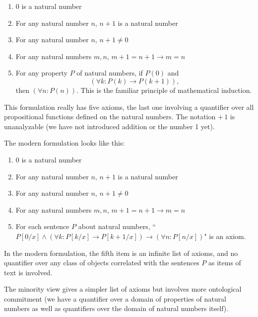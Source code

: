 \documentclass[12pt]{article}
\begin{document}
\begin{enumerate}

\item 0 is a natural number

\item  For any natural number $n$, $n+1$ is a natural number

\item  For any natural number $n$, $n+1 \neq 0$

\item  For any natural numbers $m,n$, $m+1 = n+1 \rightarrow m=n$

\item  For any property $P$ of natural numbers, if $P(0)$ and $$(\forall k:P(k) \rightarrow P(k+1)),$$ then $(\forall n:P(n))$.  This is the familiar principle of mathematical induction.

\end{enumerate}

This formulation really has five axioms, the last one involving a quantifier over all propositional functions defined on the natural numbers.  The notation $+\,1$ is unanalyzable (we have not introduced addition or the number 1 yet).

The modern formulation looks like this:

\begin{enumerate}

\item 0 is a natural number

\item  For any natural number $n$, $n+1$ is a natural number

\item  For any natural number $n$, $n+1 \neq 0$

\item  For any natural numbers $m,n$, $m+1 = n+1 \rightarrow m=n$

\item  For each sentence $P$ about natural numbers, ``$P[0/x] \wedge (\forall k:P[k/x] \rightarrow P[k+1/x]) \rightarrow (\forall n:P[n/x])$" is an axiom.

\end{enumerate}

In the modern formulation, the fifth item is an infinite list of axioms, and no quantifier over any class of objects correlated with the sentences $P$ as items of text is involved.

The minority view gives a simpler list of axioms but involves more ontological commitment (we have a quantifier over a domain of properties of natural numbers as well as quantifiers over the domain of natural numbers itself).
\end{document}
